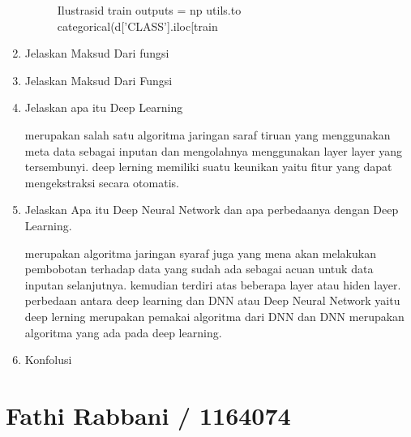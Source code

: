 \begin{enumerate}
\begin{figure}[!htbp]
      \caption{Ilustrasid train outputs = np utils.to categorical(d['CLASS'].iloc[train}
      \label{c138}
      \end{figure}

\item Jelaskan Maksud Dari fungsi

\item Jelaskan Maksud Dari Fungsi

\item Jelaskan apa itu Deep Learning \par
merupakan salah satu algoritma jaringan saraf tiruan yang menggunakan meta data sebagai inputan dan mengolahnya menggunakan layer layer yang tersembunyi. deep lerning memiliki suatu keunikan yaitu fitur yang dapat mengekstraksi secara otomatis.

\item Jelaskan Apa itu Deep Neural Network dan apa perbedaanya dengan Deep Learning.\par
merupakan algoritma jaringan syaraf juga yang mena akan melakukan pembobotan terhadap data yang sudah ada sebagai acuan untuk data inputan selanjutnya. kemudian terdiri atas beberapa layer atau hiden layer. perbedaan antara deep learning dan DNN atau Deep Neural Network yaitu deep lerning merupakan pemakai algoritma dari DNN dan DNN merupakan algoritma yang ada pada deep learning.

\item Konfolusi


\end{enumerate}

\section{Fathi Rabbani / 1164074}
